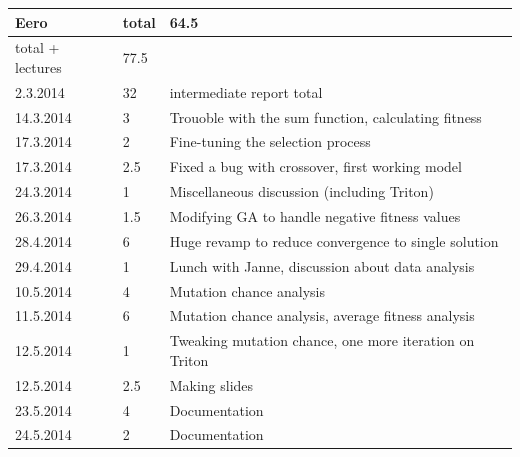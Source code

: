 \documentclass[twoside]{article}
\begin{document}
\begin{longtable}{ | l | l | p{10cm} | }
\end{longtable}

\begin{tabular}{|l|l|l|}
\hline
	\textbf{Eero} & \textbf{total} & \textbf{64.5} \\ \hline
	total + lectures & 77.5 & \  \\ \hline
	2.3.2014 & 32 & intermediate report total \\ \hline
	14.3.2014 & 3 & Trouoble with the sum function, calculating fitness \\ \hline
	17.3.2014 & 2 & Fine-tuning the selection process \\ \hline
	17.3.2014 & 2.5 & Fixed a bug with crossover, first working model \\ \hline
	24.3.2014 & 1 & Miscellaneous discussion (including Triton) \\ \hline
	26.3.2014 & 1.5 & Modifying GA to handle negative fitness values \\ \hline
	28.4.2014 & 6 & Huge revamp to reduce convergence to single solution \\ \hline
	29.4.2014 & 1 & Lunch with Janne, discussion about data analysis \\ \hline
	10.5.2014 & 4 & Mutation chance analysis \\ \hline
	11.5.2014 & 6 & Mutation chance analysis, average fitness analysis \\ \hline
	12.5.2014 & 1 & Tweaking mutation chance, one more iteration on Triton \\ \hline
	12.5.2014 & 2.5 & Making slides \\ \hline
	23.5.2014 & 4 & Documentation \\ \hline
	24.5.2014 & 2 & Documentation \\ \hline
\end{tabular}
\end{document}
